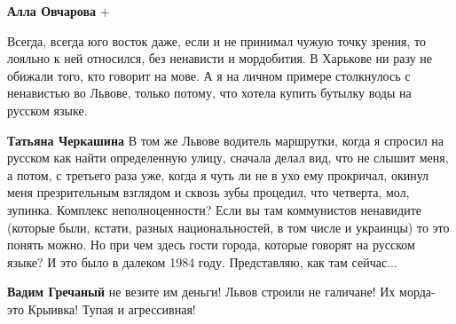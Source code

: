 \begin{itemize}
\begin{itemize}
 
\textbf{Алла Овчарова} +
\end{itemize}

 

Всегда, всегда юго восток даже, если и не принимал чужую точку зрения, то лояльно
к ней относился, без ненависти и мордобития. В Харькове ни разу не обижали
того, кто говорит на мове. А я на личном примере столкнулось с ненавистью во
Львове, только потому, что хотела купить бутылку воды на русском языке.

\begin{itemize}
 
\textbf{Татьяна Черкашина} В том же Львове водитель маршрутки, когда я спросил
на русском как найти определенную улицу, сначала делал вид, что не слышит меня,
а потом, с третьего раза уже, когда я чуть ли не в ухо ему прокричал, окинул
меня презрительным взглядом и сквозь зубы процедил, что четверта, мол, зупинка.
Комплекс неполноценности? Если вы там коммунистов ненавидите (которые были,
кстати, разных национальностей, в том числе и украинцы) то это понять можно. Но
при чем здесь гости города, которые говорят на русском языке? И это было в
далеком 1984 году. Представляю, как там сейчас...

 
\textbf{Вадим Гречаный} не везите им деньги! Львов строили не галичане! Их морда- это Крыивка! Тупая и агрессивная!

 

\end{itemize}
\end{itemize}
